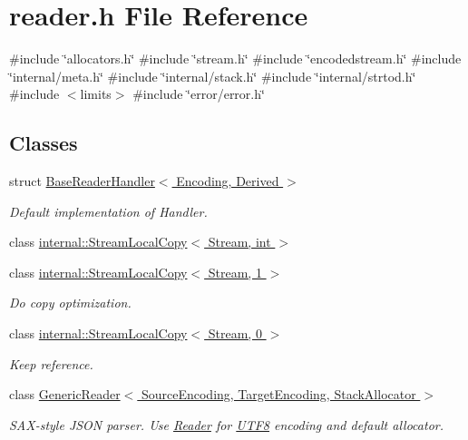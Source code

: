 \hypertarget{a00563}{}\section{reader.\+h File Reference}
\label{a00563}
{\ttfamily \#include \char`\"{}allocators.\+h\char`\"{}}\newline
{\ttfamily \#include \char`\"{}stream.\+h\char`\"{}}\newline
{\ttfamily \#include \char`\"{}encodedstream.\+h\char`\"{}}\newline
{\ttfamily \#include \char`\"{}internal/meta.\+h\char`\"{}}\newline
{\ttfamily \#include \char`\"{}internal/stack.\+h\char`\"{}}\newline
{\ttfamily \#include \char`\"{}internal/strtod.\+h\char`\"{}}\newline
{\ttfamily \#include $<$limits$>$}\newline
{\ttfamily \#include \char`\"{}error/error.\+h\char`\"{}}\newline
\subsection*{Classes}
\begin{DoxyCompactItemize}
\item 
struct \hyperlink{a02216}{Base\+Reader\+Handler$<$ Encoding, Derived $>$}
\begin{DoxyCompactList}\small\item\em Default implementation of Handler. \end{DoxyCompactList}\item 
class \hyperlink{a02320}{internal\+::\+Stream\+Local\+Copy$<$ Stream, int $>$}
\item 
class \hyperlink{a02324}{internal\+::\+Stream\+Local\+Copy$<$ Stream, 1 $>$}
\begin{DoxyCompactList}\small\item\em Do copy optimization. \end{DoxyCompactList}\item 
class \hyperlink{a02328}{internal\+::\+Stream\+Local\+Copy$<$ Stream, 0 $>$}
\begin{DoxyCompactList}\small\item\em Keep reference. \end{DoxyCompactList}\item 
class \hyperlink{a02220}{Generic\+Reader$<$ Source\+Encoding, Target\+Encoding, Stack\+Allocator $>$}
\begin{DoxyCompactList}\small\item\em S\+A\+X-\/style J\+S\+ON parser. Use \hyperlink{a00563_a84f3b66a66647f4ac4267078359188ba}{Reader} for \hyperlink{a02144}{U\+T\+F8} encoding and default allocator. \end{DoxyCompactList}\end{DoxyCompactItemize}
